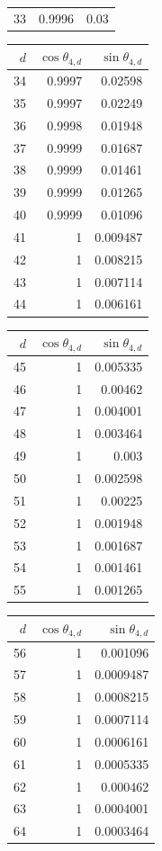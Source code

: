 {\begin{tabular}[t]{r|rr}
33 & 0.9996 & 0.03
\end{tabular}\kern4pt
\begin{tabular}[t]{r|rr}
$d$ & $\cos\theta_{4,d}$ & $\sin\theta_{4,d}$ \\\hline
34 & 0.9997 & 0.02598 \\
35 & 0.9997 & 0.02249 \\
36 & 0.9998 & 0.01948 \\
37 & 0.9999 & 0.01687 \\
38 & 0.9999 & 0.01461 \\
39 & 0.9999 & 0.01265 \\
40 & 0.9999 & 0.01096 \\
41 & 1 & 0.009487 \\
42 & 1 & 0.008215 \\
43 & 1 & 0.007114 \\
44 & 1 & 0.006161
\end{tabular}\kern4pt
\begin{tabular}[t]{r|rr}
$d$ & $\cos\theta_{4,d}$ & $\sin\theta_{4,d}$ \\\hline
45 & 1 & 0.005335 \\
46 & 1 & 0.00462 \\
47 & 1 & 0.004001 \\
48 & 1 & 0.003464 \\
49 & 1 & 0.003 \\
50 & 1 & 0.002598 \\
51 & 1 & 0.00225 \\
52 & 1 & 0.001948 \\
53 & 1 & 0.001687 \\
54 & 1 & 0.001461 \\
55 & 1 & 0.001265
\end{tabular}\kern4pt
\begin{tabular}[t]{r|rr}
$d$ & $\cos\theta_{4,d}$ & $\sin\theta_{4,d}$ \\\hline
56 & 1 & 0.001096 \\
57 & 1 & 0.0009487 \\
58 & 1 & 0.0008215 \\
59 & 1 & 0.0007114 \\
60 & 1 & 0.0006161 \\
61 & 1 & 0.0005335 \\
62 & 1 & 0.000462 \\
63 & 1 & 0.0004001 \\
64 & 1 & 0.0003464
\end{tabular}}

